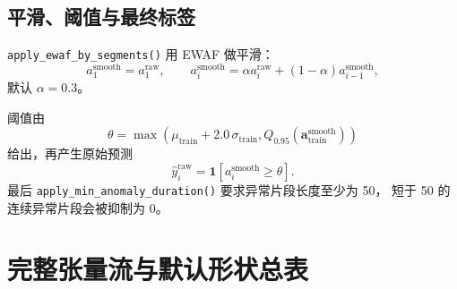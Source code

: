 \documentclass[UTF8,11pt,a4paper]{ctexart}
\begin{document}
\subsection{平滑、阈值与最终标签}

\texttt{apply\_ewaf\_by\_segments()} 用 EWAF 做平滑：
\[
a^{\mathrm{smooth}}_1=a^{\mathrm{raw}}_1,\qquad
a^{\mathrm{smooth}}_i=
\alpha a^{\mathrm{raw}}_i+(1-\alpha)a^{\mathrm{smooth}}_{i-1},
\]
默认 $\alpha=0.3$。

阈值由
\[
\theta=
\max\left(
\mu_{\mathrm{train}} + 2.0\,\sigma_{\mathrm{train}},
Q_{0.95}(\bm{a}^{\mathrm{smooth}}_{\mathrm{train}})
\right)
\]
给出，再产生原始预测
\[
\hat{y}^{\mathrm{raw}}_i=\mathbf{1}[a^{\mathrm{smooth}}_i\ge \theta].
\]
最后 \texttt{apply\_min\_anomaly\_duration()} 要求异常片段长度至少为 50，
短于 50 的连续异常片段会被抑制为 0。

\section{完整张量流与默认形状总表}
\end{document}
